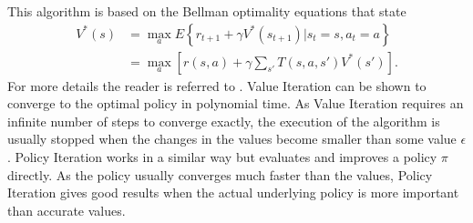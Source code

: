 \documentclass[../main.tex]{subfiles}
\begin{document}
This algorithm is based on the Bellman optimality equations that state
\begin{align}
	V^*(s) &= \max_a E\left\{r_{t+1}+\gamma V^*(s_{t+1}) | s_t = s, a_t = a\right\}\\
	&= \max_a \left[ r(s,a) + \gamma  \sum_{s'} T(s,a,s')V^*(s') \right].
\end{align}
For more details the reader is referred to \cite{sutton1998reinforcement}. Value Iteration can be shown to converge to the optimal policy in polynomial time. As Value Iteration requires an infinite number of steps to converge exactly, the execution of the algorithm is usually stopped when the changes in the values become smaller than some value $\epsilon$.
Policy Iteration works in a similar way but evaluates and improves a policy $\pi$ directly. As the policy usually converges much faster than the values, Policy Iteration gives good results when the actual underlying policy is more important than accurate values.
\end{document}
